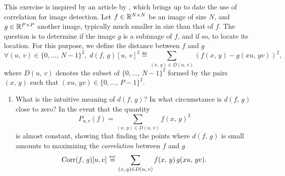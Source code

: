  
\begin{exo}
\label{exo-correlation-2d}
 
 This exercise is inspired by an article by , which brings up to date the use of correlation for image detection. Let $ f \in \mathbb{R}^{N \times N} $ be an image of size $ N $, and $ g \in \mathbb{R}^{P \times P} $ another image, typically much smaller in size than that of $ f $. The question is to determine if the image $ g $ is a subimage of $ f $, and if so, to locate its location. For this purpose, we define the distance between $ f $ and $ g $
\begin{equation*}
\forall (u, \, v) \in \{0, \ldots, \, N-1 \}^2, \; d (f, \, g) [u, \, v]^2 \eqdef \sum_{(x, \, y) \in D (u, \, v)}{\left(f(x, \, y) - g (xu, \, yv) \right)^2},
\end{equation*}
where $ D (u, \, v) $ denotes the subset of $ \{0, \ldots, \, N-1 \}^2 $ formed by the pairs $ (x, \, y) $ such that $ (xu, \, yv) \in \{0, \ldots, \, P-1 \}^2 $. \begin{enumerate}
\item {} \label{notation-55} What is the intuitive meaning of $ d (f, \, g) $? In what circumstance is $ d (f, \, g) $ close to zero? In the event that the quantity
\begin{equation*}
P_{u, v} (f) = \sum_{(x, \, y) \in D (u, \, v)}{f(x, \, y)^2}
\end{equation*}
is almost constant, showing that finding the points where $ d (f, \, g) $ is small amounts to maximizing the \textit{correlation} between $ f $ and $ g $
\begin{equation*}
\operatorname{Corr} (f, \, g) [u, v] \stackrel{\mbox{\upshape\tiny def.}}{=} \sum_{(x, \, y) \in D (u, \, v)}{f(x, \, y) \, g ( xu, \, yv)}.
\end{equation*}
 

\end{enumerate}
\end{exo}
